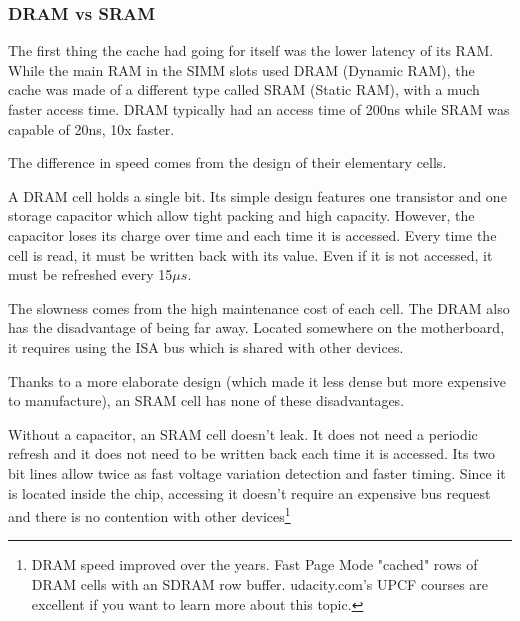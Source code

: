 \subsubsection{DRAM vs SRAM}
The first thing the cache had going for itself was the lower latency of its RAM. While the main RAM in the SIMM slots used DRAM (Dynamic RAM), the cache was made of a different type called SRAM (Static RAM), with a much faster access time. DRAM typically had an access time of 200ns while SRAM was capable of 20ns, 10x faster.\\
\par
The difference in speed comes from the design of their elementary cells.\\
\par
 A DRAM cell holds a single bit. Its simple design features one transistor and one storage capacitor which allow tight packing and high capacity. However, the capacitor loses its charge over time and each time it is accessed. Every time the cell is read, it must be written back with its value. Even if it is not accessed, it must be refreshed every 15$\mu s$.\\
\par
{}
\vspace{-5pt}
The slowness comes from the high maintenance cost of each cell. The DRAM also has the disadvantage of being far away. Located somewhere on the motherboard, it requires using the ISA bus which is shared with other devices.\\
\par

\vspace{2mm}
Thanks to a more elaborate design (which made it less dense but more expensive to manufacture), an SRAM cell has none of these disadvantages.\\
\par
{}
\par
Without a capacitor, an SRAM cell doesn't leak. It does not need a periodic refresh and it does not need to be written back each time it is accessed. Its two bit lines allow twice as fast voltage variation detection and faster timing.
Since it is located inside the chip, accessing it doesn't require an expensive bus request and there is no contention with other devices\footnote{DRAM speed improved over the years. Fast Page Mode "cached" rows of DRAM cells with an SDRAM row buffer. udacity.com's UPCF courses are excellent if you want to learn more about this topic.}
\par










